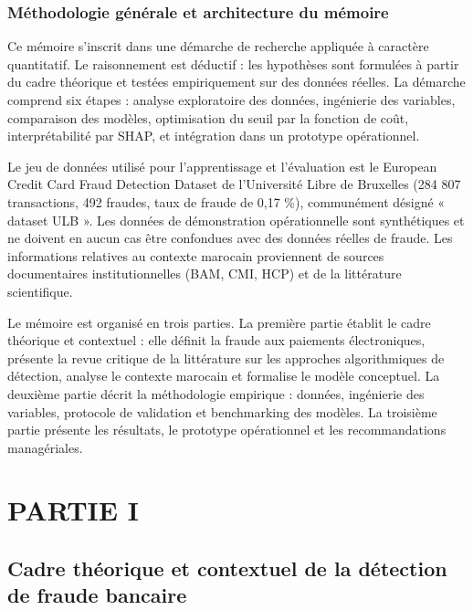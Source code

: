 \section*{Méthodologie générale et architecture du mémoire}

Ce mémoire s'inscrit dans une démarche de recherche appliquée à caractère quantitatif. Le raisonnement est déductif : les hypothèses sont formulées à partir du cadre théorique et testées empiriquement sur des données réelles. La démarche comprend six étapes : analyse exploratoire des données, ingénierie des variables, comparaison des modèles, optimisation du seuil par la fonction de coût, interprétabilité par SHAP, et intégration dans un prototype opérationnel.

Le jeu de données utilisé pour l'apprentissage et l'évaluation est le European Credit Card Fraud Detection Dataset de l'Université Libre de Bruxelles (284 807 transactions, 492 fraudes, taux de fraude de 0,17 \%), communément désigné « dataset ULB ». Les données de démonstration opérationnelle sont synthétiques et ne doivent en aucun cas être confondues avec des données réelles de fraude. Les informations relatives au contexte marocain proviennent de sources documentaires institutionnelles (BAM, CMI, HCP) et de la littérature scientifique.

Le mémoire est organisé en trois parties. La première partie établit le cadre théorique et contextuel : elle définit la fraude aux paiements électroniques, présente la revue critique de la littérature sur les approches algorithmiques de détection, analyse le contexte marocain et formalise le modèle conceptuel. La deuxième partie décrit la méthodologie empirique : données, ingénierie des variables, protocole de validation et benchmarking des modèles. La troisième partie présente les résultats, le prototype opérationnel et les recommandations managériales.

\part{PARTIE I}

\chapter*{Cadre théorique et contextuel de la détection de fraude bancaire}

